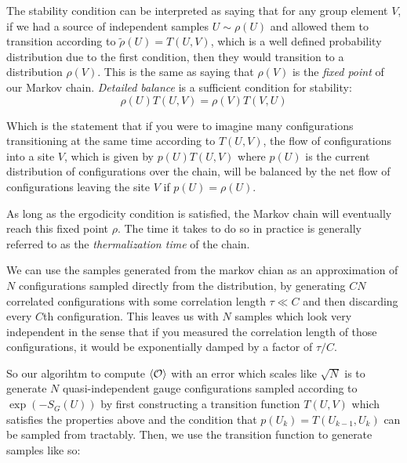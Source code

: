 \documentclass[11pt]{article}
\begin{document}
The stability condition can be interpreted as saying that for any group element $V$, if we had a source of independent samples $U\sim \rho(U)$ and allowed them to transition according to $\tilde\rho(U)=T(U,V)$, which is a well defined probability distribution due to the first condition, then they would transition to a distribution $\rho(V)$. This is the same as saying that $\rho(V)$ is the \textit{fixed point} of our Markov chain. \textit{Detailed balance} is a sufficient condition for stability:
\begin{equation}\label{eq:db}\rho(U)T(U,V)=\rho(V)T(V,U)\end{equation}

Which is the statement that if you were to imagine many configurations transitioning at the same time according to $T(U,V)$, the flow of configurations into a site $V$, which is given by $p(U)T(U,V)$ where $p(U)$ is the current distribution of configurations over the chain, will be balanced by the net flow of configurations leaving the site $V$ if $p(U)=\rho(U)$. 

As long as the ergodicity condition is satisfied, the Markov chain will eventually reach this fixed point $\rho$. The time it takes to do so in practice is generally referred to as the \textit{thermalization time} of the chain.

We can use the samples generated from the markov chian as an approximation of $N$ configurations sampled directly from the distribution, by generating $CN$ correlated configurations with some correlation length $\tau\ll C$ and then discarding every $C$th configuration. This leaves us with $N$ samples which look very independent in the sense that if you measured the correlation length of those configurations, it would be exponentially damped by a factor of $\tau/C$. 

So our algorihtm to compute $\braket{\mathcal O}$ with an error which scales like $\sqrt N$ is to generate $N$ quasi-independent gauge configurations sampled according to $\exp(-S_G(U))$ by first constructing a transition function $T(U,V)$ which satisfies the properties above and the condition that $p(U_k)=T(U_{k-1},U_k)$ can be sampled from tractably. Then, we use the transition function to generate samples like so:
\end{document}
